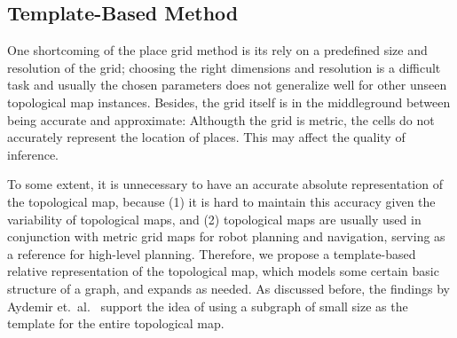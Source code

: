 \documentclass[11pt, titlepage]{article}
\theoremstyle{definition}
\begin{document}


\subsection{Template-Based Method}\label{section:tmpl}

One shortcoming of the place grid method is its rely on a predefined size and resolution of the grid; choosing the right dimensions and resolution is a difficult task and usually the chosen parameters does not generalize well for other unseen topological map instances. Besides, the grid itself is in the middleground between being accurate and approximate: Althougth the grid is metric, the cells do not accurately represent the location of places. This may affect the quality of inference.

To some extent, it is unnecessary to have an accurate absolute representation of the topological map, because (1) it is hard to maintain this accuracy given the variability of topological maps, and (2) topological maps are usually used in conjunction with metric grid maps for robot planning and navigation, serving as a reference for high-level planning. Therefore, we propose a template-based relative representation of the topological map, which models some certain basic structure of a graph, and expands as needed. As discussed before, the findings by  Aydemir et.~al.~\cite{aydemir2012can} support the idea of using a subgraph of small size as the template for the entire topological map.
\end{document}
